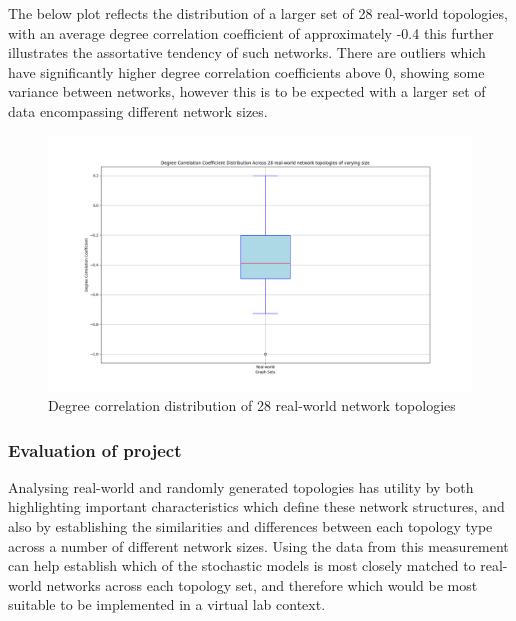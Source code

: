 The below plot reflects the distribution of a larger set of 28 real-world topologies, with an average degree correlation coefficient of approximately -0.4 this further illustrates the assortative tendency of such networks. There are outliers which have significantly higher degree correlation coefficients above 0, showing some variance between networks, however this is to be expected with a larger set of data encompassing different network sizes. 

\begin{figure}
    \centering
    \includegraphics[width=0.9\linewidth]{images/FINAL-TOPO-COMP/Degree-coeff-distrib/Distrib-28-real-world.png}
    \caption{Degree correlation distribution of 28 real-world network topologies}
    \label{fig:enter-label}
\end{figure}

\subsubsection{Evaluation of project}
Analysing real-world and randomly generated topologies has utility by both highlighting important characteristics which define these network structures, and also by establishing the similarities and differences between each topology type across a number of different network sizes. Using the data from this measurement can help establish which of the stochastic models is most closely matched to real-world networks across each topology set, and therefore which would be most suitable to be implemented in a virtual lab context. 

